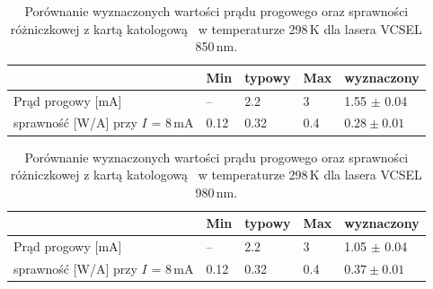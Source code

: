 \newpage
\begin{table}
\begin{center}
\label{tab:tabela1}
\caption{Porównanie wyznaczonych wartości  prądu progowego oraz sprawności różniczkowej z kartą katologową~\cite{spec_vcsel_850}
 w temperaturze 298\,K dla lasera VCSEL 850\,nm. }
\begin{adjustbox}{max width=\textwidth}
\begin{tabular}{ | C{3.5cm}|  C{1.5cm} | C{1.5cm} | C{1.5cm}| C{3.5cm}|}
\hline
           &   Min  & typowy & Max   & wyznaczony        \\ \hline
Prąd progowy [mA] &  --    &  2.2    & 3    & 1.55 $\pm$ 0.04  \\ \hline
sprawność [W/A]  przy $I$ = 8\,mA   &  0.12   &  0.32   & 0.4   & $0.28\pm 0.01$      \\ \hline
\end{tabular}
\end{adjustbox}
\end{center}
\end{table}

\begin{table}
\begin{center}
\label{tab:tabela2}
\caption{Porównanie wyznaczonych wartości prądu progowego oraz sprawności różniczkowej z kartą katologową~\cite{spec_vcsel_980}
 w temperaturze 298\,K dla lasera VCSEL 980\,nm. }
 \begin{adjustbox}{max width=\textwidth}
\begin{tabular}{ | C{3.5cm}|  C{1.5cm} | C{1.5cm} | C{1.5cm}| C{3.5cm}|}
\hline
       &   Min  & typowy & Max   & wyznaczony        \\ \hline
Prąd progowy [mA] &  --    &  2.2    & 3    & 1.05 $\pm$ 0.04  \\ \hline
sprawność [W/A]  przy $I$ = 8\,mA   &  0.12   &  0.32   & 0.4   & $0.37 \pm 0.01$     \\ \hline
\end{tabular}
\end{adjustbox}
\end{center}
\end{table}

